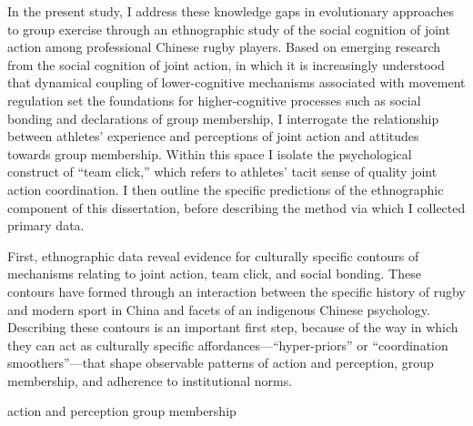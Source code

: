 In the present study, I address these knowledge gaps in evolutionary approaches to group exercise through an ethnographic study of the social cognition of joint action among professional Chinese rugby players.  Based on emerging research from the social cognition of joint action, in which it is increasingly understood that dynamical coupling of lower-cognitive mechanisms associated with movement regulation set the foundations for higher-cognitive processes such as social bonding and declarations of group membership, I interrogate the relationship between athletes' experience and perceptions of joint action and attitudes towards group membership.  Within this space I isolate the psychological construct of ``team click,'' which refers to athletes' tacit sense of quality joint action coordination.   I then outline the specific predictions of the ethnographic component of this dissertation, before describing the method via which I collected primary data.



First, ethnographic data reveal evidence for culturally specific contours of mechanisms relating to joint action, team click, and social bonding.  These contours have formed through an interaction between the specific history of rugby and modern sport in China and facets of an indigenous Chinese psychology.  Describing these contours is an important first step, because of the way in which they can act as culturally specific affordances---``hyper-priors'' or ``coordination smoothers''---that shape observable patterns of action and perception, group membership, and adherence to institutional norms.

action and perception
group membership



